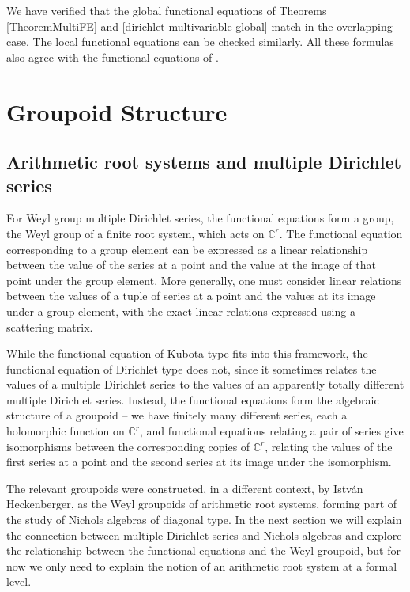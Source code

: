 \documentclass[11pt,letterpaper]{article}
\theoremstyle{definition}
\theoremstyle{remark}
\numberwithin{equation}{section}
\theoremstyle{dotless}
\begin{document}
We have verified that the global functional equations of Theorems \ref{TheoremMultiFE} and \ref{dirichlet-multivariable-global} match in the overlapping case. The local functional equations can be checked similarly. All these formulas also agree with the functional equations of \cite{WhiteheadThesis}.

\section{Groupoid Structure} \label{SectionGroup}
\subsection{Arithmetic root systems and multiple Dirichlet series}

For Weyl group multiple Dirichlet series, the functional equations form a group, the Weyl group of a finite root system, which acts on $\mathbb C^r$. The functional equation corresponding to a group element can be expressed as a linear relationship between the value of the series at a point and the value at the image of that point under the group element. More generally, one must consider linear relations between the values of a tuple of series at a point and the values at its image under a group element, with the exact linear relations expressed using a scattering matrix. 

While the functional equation of Kubota type fits into this framework, the functional equation of Dirichlet type does not, since it sometimes relates the values of a multiple Dirichlet series to the values of an apparently totally different multiple Dirichlet series. Instead, the functional equations form the algebraic structure of a groupoid -- we have finitely many different series, each a holomorphic function on $\mathbb C^r$, and functional equations relating a pair of series give isomorphisms between the corresponding copies of $\mathbb C^r$, relating the values of the first series at a point and the second series at its image under the isomorphism.

The relevant groupoids were constructed, in a different context, by Istv\'an Heckenberger, as the Weyl groupoids of arithmetic root systems, forming part of the study of Nichols algebras of diagonal type. In the next section we will explain the connection between multiple Dirichlet series and Nichols algebras and explore the relationship between the functional equations and the Weyl groupoid, but for now we only need to explain the notion of an arithmetic root system at a formal level.
\end{document}
